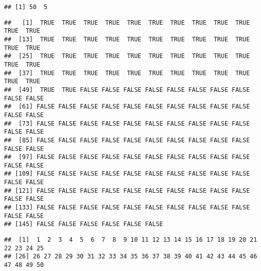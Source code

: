 \documentclass[
]{article}
\newenvironment{Shaded}{\begin{snugshade}}{\end{snugshade}}
\newcommand{\DocumentationTok}[1]{\textcolor[rgb]{0.56,0.35,0.01}{\textbf{\textit{#1}}}}
\newcommand{\FunctionTok}[1]{\textcolor[rgb]{0.13,0.29,0.53}{\textbf{#1}}}
\newcommand{\NormalTok}[1]{#1}
\newcommand{\SpecialCharTok}[1]{\textcolor[rgb]{0.81,0.36,0.00}{\textbf{#1}}}
\newcommand{\StringTok}[1]{\textcolor[rgb]{0.31,0.60,0.02}{#1}}
\begin{document}
\begin{verbatim}
## [1] 50  5
\end{verbatim}

\begin{Shaded}
\end{Shaded}

\begin{verbatim}
##   [1]  TRUE  TRUE  TRUE  TRUE  TRUE  TRUE  TRUE  TRUE  TRUE  TRUE  TRUE  TRUE
##  [13]  TRUE  TRUE  TRUE  TRUE  TRUE  TRUE  TRUE  TRUE  TRUE  TRUE  TRUE  TRUE
##  [25]  TRUE  TRUE  TRUE  TRUE  TRUE  TRUE  TRUE  TRUE  TRUE  TRUE  TRUE  TRUE
##  [37]  TRUE  TRUE  TRUE  TRUE  TRUE  TRUE  TRUE  TRUE  TRUE  TRUE  TRUE  TRUE
##  [49]  TRUE  TRUE FALSE FALSE FALSE FALSE FALSE FALSE FALSE FALSE FALSE FALSE
##  [61] FALSE FALSE FALSE FALSE FALSE FALSE FALSE FALSE FALSE FALSE FALSE FALSE
##  [73] FALSE FALSE FALSE FALSE FALSE FALSE FALSE FALSE FALSE FALSE FALSE FALSE
##  [85] FALSE FALSE FALSE FALSE FALSE FALSE FALSE FALSE FALSE FALSE FALSE FALSE
##  [97] FALSE FALSE FALSE FALSE FALSE FALSE FALSE FALSE FALSE FALSE FALSE FALSE
## [109] FALSE FALSE FALSE FALSE FALSE FALSE FALSE FALSE FALSE FALSE FALSE FALSE
## [121] FALSE FALSE FALSE FALSE FALSE FALSE FALSE FALSE FALSE FALSE FALSE FALSE
## [133] FALSE FALSE FALSE FALSE FALSE FALSE FALSE FALSE FALSE FALSE FALSE FALSE
## [145] FALSE FALSE FALSE FALSE FALSE FALSE
\end{verbatim}

\begin{Shaded}
\end{Shaded}

\begin{verbatim}
##  [1]  1  2  3  4  5  6  7  8  9 10 11 12 13 14 15 16 17 18 19 20 21 22 23 24 25
## [26] 26 27 28 29 30 31 32 33 34 35 36 37 38 39 40 41 42 43 44 45 46 47 48 49 50
\end{verbatim}

\begin{Shaded}
\end{Shaded}
\end{document}
